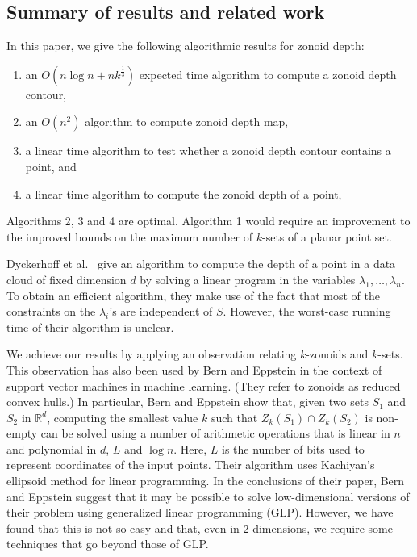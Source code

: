 \documentclass[charterfonts,lotsofwhite]{patmorin}
\begin{document}
\subsection{Summary of results and related work}
\label{subsection_summary_of_results}

In this paper, we give the following algorithmic results for zonoid
depth:

\begin{enumerate}

\item an $O(n \log n + nk^{\frac{1}{3}})$ expected time algorithm to
compute a zonoid depth contour,

\item an $O(n^2)$ algorithm to compute zonoid depth map,

\item a linear time algorithm to test whether a zonoid depth contour
contains a point, and 

\item a linear time algorithm to compute the zonoid depth of a point,

\end{enumerate}

Algorithms 2, 3 and 4 are optimal. Algorithm 1 would require an
improvement to the improved bounds on the maximum number of $k$-sets
of a planar point set.

Dyckerhoff et al.\ \cite{zonoid_data_depth_theory_and_computation}
give an algorithm to compute the depth of a point in a data cloud of
fixed dimension $d$ by solving a linear program in the variables
$\lambda_1,\ldots, \lambda_n$. To obtain an efficient algorithm, they
make use of the fact that most of the constraints on the $\lambda_i$'s
are independent of $S$. However, the worst-case running time of their
algorithm is unclear. 

We achieve our results by applying an observation relating $k$-zonoids
and $k$-sets.  This observation has also been used by Bern and
Eppstein \cite{bern-eppstein-01} in the context of support vector
machines in machine learning.  (They refer to zonoids as reduced
convex hulls.) In particular, Bern and Eppstein show that, given two
sets $S_1$ and $S_2$ in $\mathbb{R}^d$, computing the smallest value
$k$ such that $Z_k(S_1)\cap Z_k(S_2)$ is non-empty can be solved using
a number of arithmetic operations that is linear in $n$ and polynomial
in $d$, $L$ and $\log n$.  Here, $L$ is the number of bits used to
represent coordinates of the input points.  Their algorithm uses
Kachiyan's ellipsoid method \cite{k79} for linear programming.  In the
conclusions of their paper, Bern and Eppstein suggest that it may be
possible to solve low-dimensional versions of their problem using
generalized linear programming (GLP).  However, we have found that
this is not so easy and that, even in 2 dimensions, we require some
techniques that go beyond those of GLP.
\end{document}

